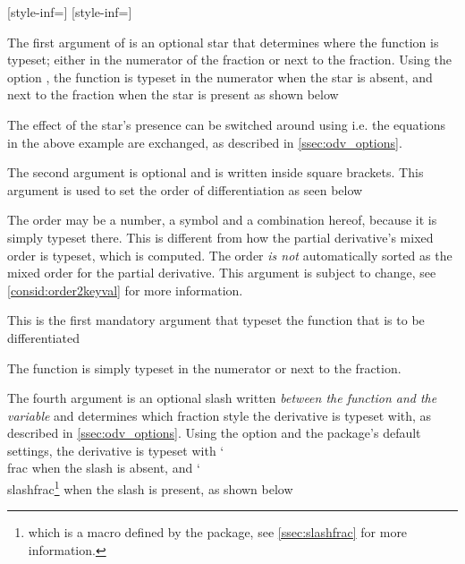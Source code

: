 \documentclass[final,british,10pt]{scrartcl}
\theoremstyle{remark}
\DeclareRobustCommand\cs[1]{{\CommonFont \char`\\#1}}
\begin{document}
\begin{definition}
	[style-inf=\mathrm]%
	[style-inf=\symup]
\end{definition}

The first argument of  is an optional star that determines where the function is typeset; either in the numerator of the fraction or next to the fraction. Using the option , the function is typeset in the numerator when the star is absent, and next to the fraction when the star is present as shown below


\noindent The effect of the star's presence can be switched around using  i.e. the equations in the above example are exchanged, as described in \cref{ssec:odv_options}.

The second argument is optional and is written inside square brackets. This argument is used to set the order of differentiation as seen below


\noindent The order may be a number, a symbol and a combination hereof, because it is simply typeset there. This is different from how the partial derivative's mixed order is typeset, which is computed. The order \textit{is not} automatically sorted as the mixed order for the partial derivative. This argument is subject to change, see \cref{consid:order2keyval} for more information.

This is the first mandatory argument that typeset the function that is to be differentiated


\noindent The function is simply typeset in the numerator or next to the fraction.

The fourth argument is an optional slash written \emph{between the function and the variable} and determines which fraction style the derivative is typeset with, as described in \cref{ssec:odv_options}. Using the option  and the package's default settings, the derivative is typeset with \cs{frac} when the slash is absent, and \cs{slashfrac}\footnote{which is a macro defined by the package, see \cref{ssec:slashfrac} for more information.\label{foot:sfrac}} when the slash is present, as shown below
\end{document}
